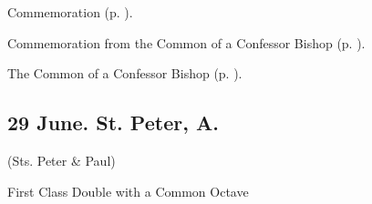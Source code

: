 \begin{rubric}
	Commemoration  (p. \pageref{JohnBaptistCollect}).
\end{rubric}

\begin{rubric}
	Commemoration  from the Common of a Confessor Bishop (p. \pageref{ConfessorBishopCollect}).
\end{rubric}



\begin{rubric}
	The Common of a Confessor Bishop (p. \pageref{ConfessorBishopCollect}).
\end{rubric}


\clearpage

\subsection{{\color{FestiveWhite}29 June. St. Peter,} {\color{RubricRed}A.}}\label{SaintPeter}

\centerline{\small{(Sts. Peter \& Paul)}}

\begin{inhead}
	First Class Double with a Common Octave
\end{inhead}



